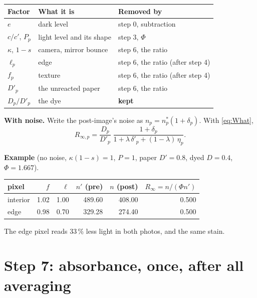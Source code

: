 \documentclass[11pt,letter]{article}
\newcommand{\Rinf}{R_{\infty}}
\begin{document}
\medskip
\begin{center}
\begin{tabular}{@{}lll@{}}
\toprule
Factor & What it is & Removed by \\
\midrule
$e$ & dark level & step 0, subtraction \\
$c/c'$, $P_p$ & light level and its shape & step 3, $\Phi$ \\
$\kappa$, $1-s$ & camera, mirror bounce & step 6, the ratio \\
$\ell_p$ & edge & step 6, the ratio (after step 4) \\
$f_p$ & texture & step 6, the ratio (after step 4) \\
$D'_p$ & the unreacted paper & step 6, the ratio \\
\midrule
$D_p/D'_p$ & the dye & \textbf{kept} \\
\bottomrule
\end{tabular}
\end{center}

\textbf{With noise.}  Write the post-image's noise as $n_p = n^*_p(1 +
\delta_p)$.  With \eqref{eq:What},
\begin{equation}
  R_{\infty,p} = \frac{D_p}{D'_p}\;
  \frac{1 + \delta_p}{1 + \lambda\,\delta'_p + (1-\lambda)\,\eta_p} .
  \label{eq:Rinf-noise}
\end{equation}

\textbf{Example} (no noise, $\kappa(1-s) = 1$, $P = 1$, paper $D' = 0.8$,
dyed $D = 0.4$, $\Phi = 1.667$).

\medskip
\begin{center}
\begin{tabular}{@{}lrrrrr@{}}
\toprule
pixel & $f$ & $\ell$ & $n'$ (pre) & $n$ (post) & $\Rinf = n/(\Phi n')$ \\
\midrule
interior & 1.02 & 1.00 & 489.60 & 408.00 & 0.500 \\
edge     & 0.98 & 0.70 & 329.28 & 274.40 & 0.500 \\
\bottomrule
\end{tabular}
\end{center}
The edge pixel reads 33\,\% less light in both photos, and the same stain.

\section{Step 7: absorbance, once, after all averaging}
\label{sec:absorbance}
\end{document}
